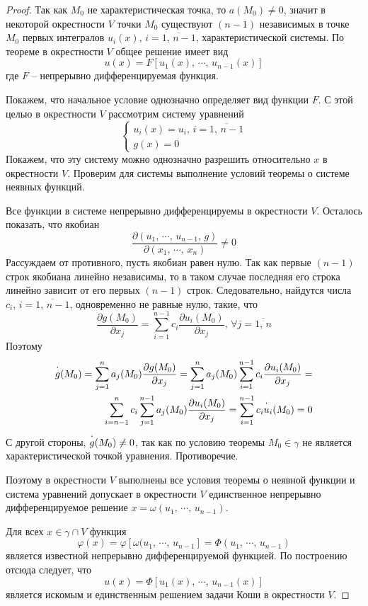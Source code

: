 \documentclass[a4paper,12pt]{article}
\renewcommand{\phi}{\ensuremath{\varphi}}
\theoremstyle{plain}
\theoremstyle{definition}
\theoremstyle{remark}
\begin{document}
\begin{proof}
	Так как $M_0$ не характеристическая точка, то $a(M_0) \neq 0$, значит в некоторой окрестности $V$ точки $M_0$ существуют $(n-1)$ независимых в точке $M_0$ первых интегралов $u_i(x),\, i =\overline{1,\,n-1}$, характеристической системы. По теореме в окрестности $V$ общее решение имеет вид
	\[u(x) = F[u_1(x),\,\cdots,\,u_{n - 1}(x)]\]
	где $F$ -- непрерывно дифференцируемая функция.

	Покажем, что начальное условие однозначно определяет вид функции $F$. С этой целью в окрестности $V$ рассмотрим систему уравнений
	\[\begin{cases}
			u_i(x) = u_i,\, i = \overline{1,\,n-1} \\
			g(x) = 0
		\end{cases}\]
	Покажем, что эту систему можно однозначно разрешить относительно $x$ в окрестности $V$. Проверим для системы выполнение условий теоремы о системе неявных функций.

	Все функции в системе непрерывно дифференцируемы в окрестности $V$. Осталось показать, что якобиан
	\[\frac{\partial(u_1,\,\cdots,\,u_{n-1},\,g)}{\partial(x_1,\,\cdots,\,x_n)} \neq 0\]
	Рассуждаем от противного, пусть якобиан равен нулю. Так как первые $(n-1)$ строк якобиана линейно независимы, то в таком случае последняя его строка линейно зависит от его первых $(n-1)$ строк. Следовательно, найдутся числа $c_i,\, i = \overline{1,\,n-1}$, одновременно не равные нулю, такие, что
	\[\frac{\partial g(M_0)}{\partial x_j} = \sum_{i = 1}^{n-1}c_i\frac{\partial u_i(M_0)}{\partial x_j},\, \forall j = \overline{1,\,n}\]
	Поэтому
	\begin{align*}
		\overset{`}{g}(M_0) = \sum_{j = 1}^n a_j(M_0)\frac{\partial g(M_0)}{\partial x_j} = \sum_{j = 1}^n a_j(M_0)\sum_{i = 1}^{n-1}c_i\frac{\partial u_i(M_0)}{\partial x_j} = \\
		\sum_{i = n-1}^n c_i \sum_{j = 1}^{n-1} a_j(M_0)\frac{\partial u_i(M_0)}{\partial x_j} = \sum_{i = 1}^{n-1}c_i\overset{`}{u}_i(M_0) = 0
	\end{align*}
	С другой стороны, $\overset{`}{g}(M_0) \neq 0$, так как по условию теоремы $M_0 \in \gamma$ не является характеристической точкой уравнения. Противоречие.

	Поэтому в окрестности $V$ выполнены все условия теоремы о неявной функции и система уравнений допускает в окрестности $V$ единственное непрерывно дифференцируемое решение $x = \omega(u_1,\,\cdots,\,u_{n-1})$.

	Для всех $x \in \gamma \cap V$ функция
	\[\phi(x) = \phi[\omega(u_1,\,\cdots,\,u_{n-1}]= \Phi(u_1,\,\cdots,\,u_{n-1})\]
	является известной непрерывно дифференцируемой функцией. По построению отсюда следует, что
	\[u(x) = \Phi[u_1(x),\,\cdots,\,u_{n-1}(x)]\]
	является искомым и единственным решением задачи Коши в окрестности $V$.
\end{proof}
\end{document}

